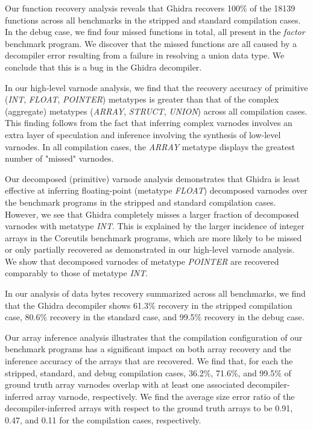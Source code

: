 \documentclass[conference]{IEEEtran}
\begin{document}
Our function recovery analysis reveals that Ghidra recovers 100\% of the 18139 functions across all benchmarks in the stripped and standard compilation cases. In the debug case, we find four missed functions in total, all present in the \emph{factor} benchmark program. We discover that the missed functions are all caused by a decompiler error resulting from a failure in resolving a union data type. We conclude that this is a bug in the Ghidra decompiler.

In our high-level varnode analysis, we find that the recovery accuracy of primitive (\emph{INT}, \emph{FLOAT}, \emph{POINTER}) metatypes is greater than that of the complex (aggregate) metatypes (\emph{ARRAY}, \emph{STRUCT}, \emph{UNION}) across all compilation cases. This finding follows from the fact that inferring complex varnodes involves an extra layer of speculation and inference involving the synthesis of low-level varnodes. In all compilation cases, the \emph{ARRAY} metatype displays the greatest number of "missed" varnodes.

Our decomposed (primitive) varnode analysis demonstrates that Ghidra is least effective at inferring floating-point (metatype \emph{FLOAT}) decomposed varnodes over the benchmark programs in the stripped and standard compilation cases. However, we see that Ghidra completely misses a larger fraction of decomposed varnodes with metatype \emph{INT}. This is explained by the larger incidence of integer arrays in the Coreutils benchmark programs, which are more likely to be missed or only partially recovered as demonstrated in our high-level varnode analysis. We show that decomposed varnodes of metatype \emph{POINTER} are recovered comparably to those of metatype \emph{INT}.

In our analysis of data bytes recovery summarized across all benchmarks, we find that the Ghidra decompiler shows 61.3\% recovery in the stripped compilation case, 80.6\% recovery in the standard case, and 99.5\% recovery in the debug case.

Our array inference analysis illustrates that the compilation configuration of our benchmark programs has a significant impact on both array recovery and the inference accuracy of the arrays that are recovered. We find that, for each the stripped, standard, and debug compilation cases, 36.2\%, 71.6\%, and 99.5\% of ground truth array varnodes overlap with at least one associated decompiler-inferred array varnode, respectively. We find the average size error ratio of the decompiler-inferred arrays with respect to the ground truth arrays to be 0.91, 0.47, and 0.11 for the compilation cases, respectively.
\end{document}

